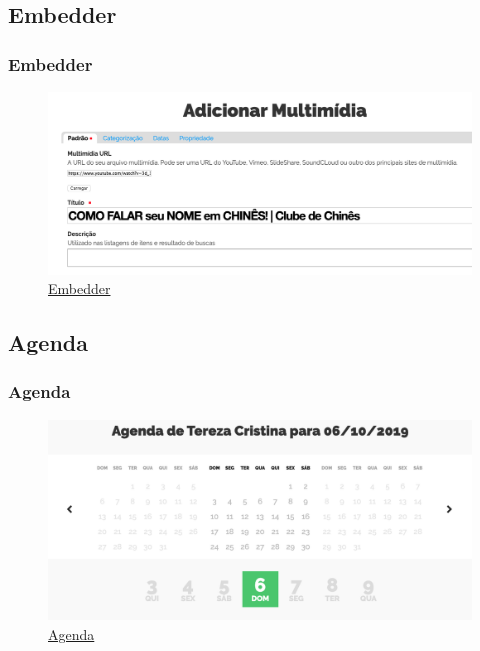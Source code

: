 \documentclass{beamer}
\begin{document}
\subsection{Embedder}
\begin{frame}
    \frametitle{Embedder}
    \begin{figure}
        \includegraphics[height=.6\textheight]{./img/001-011_-_embedder.png}
        \caption{\href{https://github.com/collective/sc.embedder}{Embedder}}
    \end{figure}
\end{frame}

\subsection{Agenda}
\begin{frame}
    \frametitle{Agenda}
    \begin{figure}
        \includegraphics[height=.6\textheight]{./img/001-012_-_agenda.png}
        \caption{\href{https://github.com/plonegovbr/brasil.gov.agenda}{Agenda}}
    \end{figure}
\end{frame}

\end{document}
